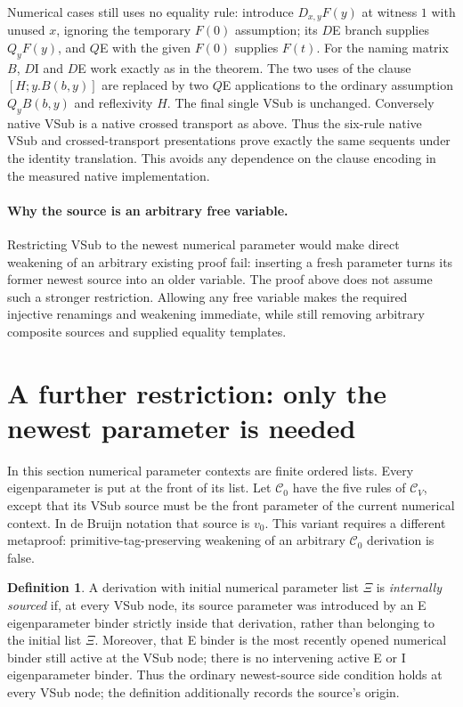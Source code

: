 \documentclass[11pt]{article}
\theoremstyle{definition}
\newtheorem{definition}[theorem]{Definition}
\theoremstyle{remark}
\begin{document}
Numerical cases still uses no equality rule: introduce
$D_{x,y}F(y)$ at witness $1$ with unused $x$, ignoring the temporary
$F(0)$ assumption; its $D$E branch supplies $Q_yF(y)$, and $Q$E
with the given $F(0)$ supplies $F(t)$. For the naming matrix $B$,
$D$I and $D$E work exactly as in the theorem. The two uses of the
clause $[H;y.B(b,y)]$ are replaced by two $Q$E applications to the
ordinary assumption $Q_yB(b,y)$ and reflexivity $H$. The final single
VSub is unchanged. Conversely native VSub is a native crossed
transport as above. Thus the six-rule native VSub and crossed-transport
presentations prove exactly the same sequents under the identity
translation. This avoids any dependence on the clause encoding in
the measured native implementation.

\paragraph{Why the source is an arbitrary free variable.}
Restricting VSub to the newest numerical parameter would make direct
weakening of an arbitrary existing proof fail: inserting a fresh
parameter turns its former newest source into an older variable.
The proof above does not assume such a stronger restriction. Allowing
any free variable makes the required injective renamings and weakening
immediate, while still removing arbitrary composite sources and
supplied equality templates.

\section{A further restriction: only the newest parameter is needed}

In this section numerical parameter contexts are finite ordered lists.
Every eigenparameter is put at the front of its list. Let
$\mathcal C_0$ have the five rules of $\mathcal C_V$, except that its
VSub source must be the front parameter of the current numerical
context. In de Bruijn notation that source is $v_0$. This variant
requires a different metaproof: primitive-tag-preserving weakening of
an arbitrary $\mathcal C_0$ derivation is false.

\begin{definition}
A derivation with initial numerical parameter list $\Xi$ is
\emph{internally sourced} if, at every VSub node, its source parameter
was introduced by an E eigenparameter binder strictly inside that
derivation, rather than belonging to the initial list $\Xi$.
Moreover, that E binder is the most recently opened numerical binder
still active at the VSub node; there is no intervening active E or I
eigenparameter binder.
Thus the ordinary newest-source side condition holds at every
VSub node; the definition additionally records the source's origin.
\end{definition}
\end{document}
